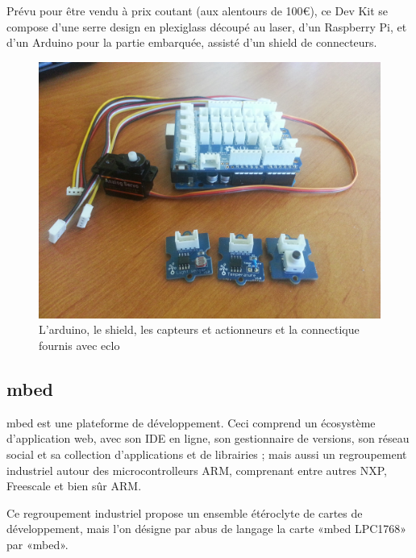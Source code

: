 \documentclass{article}
\begin{document}
Prévu pour être vendu à prix coutant (aux alentours de 100€), ce Dev Kit se compose d’une serre design en plexiglass découpé au laser, d’un Raspberry Pi, et d’un Arduino pour la partie embarquée, assisté d’un shield de connecteurs.

\begin{figure}[h!]
    \centering\includegraphics[width=\linewidth*2/3]{img/arduino_shield.jpg}
    \caption{L’arduino, le shield, les capteurs et actionneurs et la connectique fournis avec eclo}
\end{figure}

\clearpage

\subsection{mbed}
\label{mbed}

mbed est une plateforme de développement. Ceci comprend un écosystème d’application web, avec son IDE en ligne, son gestionnaire de versions, son réseau social et sa collection d’applications et de librairies ; mais aussi un regroupement industriel autour des microcontrolleurs ARM, comprenant entre autres NXP, Freescale et bien sûr ARM.

Ce regroupement industriel propose un ensemble étéroclyte de cartes de développement, mais l’on désigne par abus de langage la carte «mbed LPC1768» par «mbed».
\end{document}
